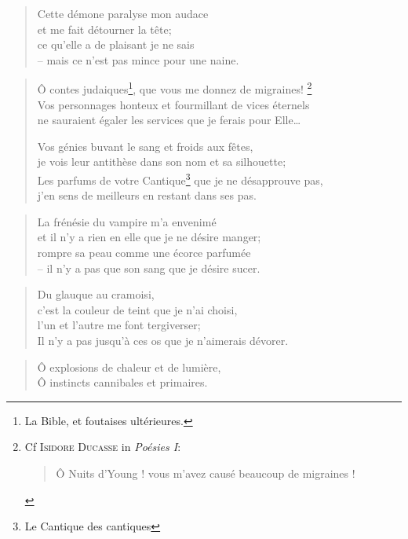  \begin{verse}
    Cette démone paralyse mon audace\\
    et me fait détourner la tête;\\
    ce qu’elle a de plaisant je ne sais\\
    -- mais ce n’est pas mince pour une naine.
  \end{verse}
  \begin{verse}
    Ô contes judaiques\footnote{La Bible, et foutaises ultérieures.}, que vous me donnez de migraines!
      \footnote{
	Cf \textsc{Isidore Ducasse} in \emph{Poésies I}:
	\begin{quote}
	  Ô Nuits d'Young ! vous m'avez causé beaucoup de migraines ! 
	\end{quote}
      }\\
    Vos personnages honteux et fourmillant de vices éternels\\
    ne sauraient égaler les services que je ferais pour Elle…

    Vos génies buvant le sang et froids aux fêtes,\\
    je vois leur antithèse dans son nom et sa silhouette;\\
    Les parfums de votre Cantique\footnote{Le Cantique des cantiques} que je ne désapprouve pas,\\
    j’en sens de meilleurs en restant dans ses pas.
  \end{verse}
  \begin{verse}
    La frénésie du vampire m’a envenimé\\
    et il n’y a rien en elle que je ne désire manger;\\
    rompre sa peau comme une écorce parfumée\\
    -- il n’y a pas que son sang que je désire sucer.
  \end{verse}
  \begin{verse}
    Du glauque au cramoisi,\\
    c’est la couleur de teint que je n’ai choisi,\\
    l’un et l’autre me font tergiverser;\\
    Il n’y a pas jusqu’à ces os que je n’aimerais dévorer.
  \end{verse}
  \begin{verse}
    Ô explosions de chaleur et de lumière,\\
    Ô instincts cannibales et primaires.
  \end{verse}
